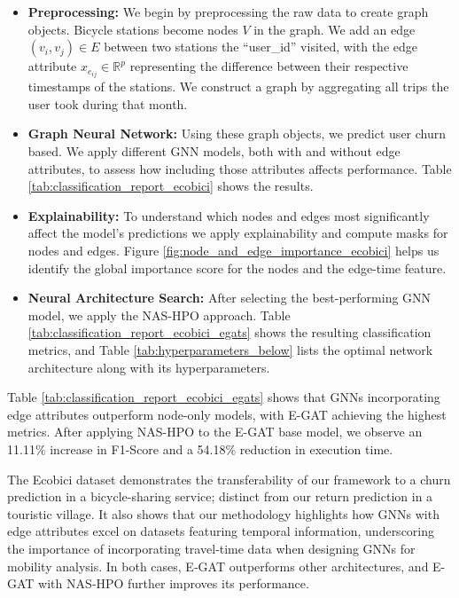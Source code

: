 \documentclass[journal]{IEEEtran}
\begin{document}
\begin{itemize}
    \item \textbf{Preprocessing:} We begin by preprocessing the raw data to create graph objects. Bicycle stations become nodes $V$ in the graph. We add an edge $(v_i, v_j) \in E$ between two stations the ``user\_id'' visited, with the edge attribute $x_{e_{ij}} \in \mathbb{R}^p$ representing the difference between their respective timestamps of the stations.  We construct a graph by aggregating all trips the user took during that month.
    
    \item \textbf{Graph Neural Network:}  Using these graph objects, we predict user churn based. We apply different GNN models, both with and without edge attributes, to assess how including those attributes affects performance. Table \ref{tab:classification_report_ecobici} shows the results.
    \item \textbf{Explainability:} To understand which nodes and edges most significantly affect the model's predictions we apply explainability and compute masks for nodes and edges. Figure \ref{fig:node_and_edge_importance_ecobici} helps us identify the global importance score for the nodes and the edge-time feature.
    \item \textbf{Neural Architecture Search:} After selecting the best-performing GNN model, we apply the NAS‐HPO approach. Table \ref{tab:classification_report_ecobici_egats} shows the resulting classification metrics, and Table \ref{tab:hyperparameters_below} lists the optimal network architecture along with its hyperparameters.
\end{itemize}


Table \ref{tab:classification_report_ecobici_egats} shows that GNNs incorporating edge attributes outperform node-only models, with E-GAT achieving the highest metrics. After applying NAS-HPO to the E-GAT base model, we observe an 11.11\% increase in F1-Score and a 54.18\% reduction in execution time. 

The Ecobici dataset demonstrates the transferability of our framework to a churn prediction in a bicycle-sharing service; distinct from our return prediction in a touristic village. It also shows that our methodology highlights how GNNs with edge attributes excel on datasets featuring temporal information, underscoring the importance of incorporating travel‐time data when designing GNNs for mobility analysis. In both cases, E‐GAT outperforms other architectures, and E-GAT with NAS‐HPO further improves its performance.
\end{document}

